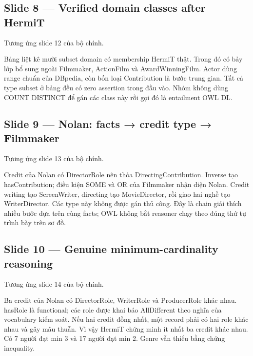 \documentclass[
  11pt,
]{article}
\begin{document}
\subsection{Slide 8 --- Verified domain classes after
HermiT}\label{slide-8-verified-domain-classes-after-hermit}

Tương ứng slide 12 của bộ chính.

Bảng liệt kê mười subset domain có membership HermiT thật. Trong đó có
bảy lớp bổ sung ngoài Filmmaker, ActionFilm và
Award\allowbreak{}Win\allowbreak{}ning\allowbreak{}Film\allowbreak{}.\allowbreak{}
Actor dùng range chuẩn của DBpedia, còn bốn loại Contribution là bước
trung gian. Tất cả type subset ở bảng đều có zero assertion trong đầu
vào. Nhóm không dùng COUNT DISTINCT để gán các class này rồi gọi đó là
entailment OWL DL.

\subsection{Slide 9 --- Nolan: facts → credit type →
Filmmaker}\label{slide-9-nolan-facts-credit-type-filmmaker}

Tương ứng slide 13 của bộ chính.

Credit của Nolan có DirectorRole nên thỏa
Directin\allowbreak{}g\allowbreak{}Contrib\allowbreak{}ution.\allowbreak{}
Inverse tạo has\allowbreak{}Contr\allowbreak{}ibution;\allowbreak{} điều
kiện SOME và OR của Filmmaker nhận diện Nolan. Credit writing tạo
Screen\allowbreak{}Wr\allowbreak{}iter, directing tạo
Movie\allowbreak{}Dir\allowbreak{}ector, rồi giao hai nghề tạo
Writer\allowbreak{}Di\allowbreak{}rector.\allowbreak{} Các type này
không được gán thủ công. Đây là chain giải thích nhiều bước dựa trên
cùng facts; OWL không bắt reasoner chạy theo đúng thứ tự trình bày trên
sơ đồ.

\subsection{\texorpdfstring{Slide 10 --- Genuine
minimum-\allowbreak{}cardinal\allowbreak{}ity
reasoning}{Slide 10 --- Genuine  reasoning}}\label{slide-10-genuine-minimum-cardinality-reasoning}

Tương ứng slide 14 của bộ chính.

Ba credit của Nolan có Director\allowbreak{}\allowbreak{}Role,
WriterRole và ProducerRole khác nhau. hasRole là functional; các role
được khai báo AllDifferent theo nghĩa của vocabulary kiểm soát. Nếu hai
credit đồng nhất, một record phải có hai role khác nhau và gây mâu
thuẫn. Vì vậy HermiT chứng minh ít nhất ba credit khác nhau. Có 7 người
đạt min 3 và 17 người đạt min 2. Genre vẫn thiếu bằng chứng inequality.
\end{document}
